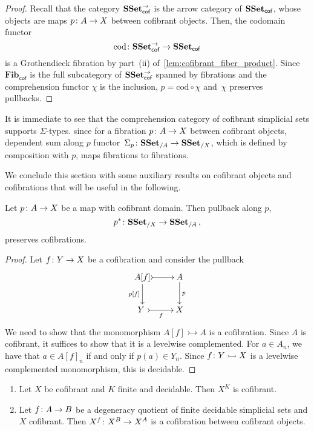 \documentclass[reqno,10pt,a4paper,oneside,draft]{amsart}
\begin{document}
\begin{proof} Recall that the category $\mathbf{SSet}^\to_{\mathsf{cof}}$ is the arrow category of $\mathbf{SSet}_{\mathsf{cof}}$, whose objects are
maps $p \colon A \to X$ between cofibrant objects. Then, the codomain
functor 
\[
\mathrm{cod} \colon \mathbf{SSet}^{\to}_{\mathsf{cof}} \to \mathbf{SSet}_{\mathsf{cof}}
\] 
is a Grothendieck fibration by part~(ii) of~\cref{lem:cofibrant_fiber_product}. 
Since $\mathbf{Fib}_{ \mathsf{cof}}$ is the full subcategory of $\mathbf{SSet}^{\to}_{\mathsf{cof}}$ spanned by fibrations and the comprehension functor $\chi$ is the inclusion, $p = \mathrm{cod} \circ \chi$
and~$\chi$ preserves pullbacks.
\end{proof}



\begin{remark} \label{thm:sigma-types} It is immediate to see that the comprehension category of cofibrant simplicial sets supports $\Sigma$-types. since for a fibration $p \colon A \to X$ between cofibrant objects, dependent sum along $p$  functor~$\Sigma_p \colon \mathbf{SSet}_{/A} \to \mathbf{SSet}_{/X}$, which is defined by
composition with $p$, maps fibrations to fibrations.
\end{remark}

\medskip


We conclude this section with some auxiliary results on cofibrant objects and cofibrations
that will be useful in the following. 


\begin{proposition} \label{thm:cof-pbk}  Let $p \colon A \to X$  be a map with cofibrant domain.
Then pullback along $p$, \[
p^* \colon \mathbf{SSet}_{/X} \to \mathbf{SSet}_{/A} \, , 
\]
preserves cofibrations. 
\end{proposition}

\begin{proof} Let $f \colon Y \to X$ be a cofibration and consider the pullback
\[
\xymatrix{
A[f]  \ar@{>->}[r] \ar[d]_-{p[f]} &  A \ar[d]^{p} \\
Y \ar@{>->}[r]_{f} \ & X}
\]
We need to show that the monomorphism $A[f] \rightarrowtail A$ is a cofibration. 
Since $A$ is cofibrant, it suffices to show that it is a levelwise complemented. For $a \in A_n$, we have that $a \in A[f]_n$ if and only if $p(a) \in Y_n$. Since $f \colon Y \rightarrowtail X$ is a levelwise complemented monomorphism, this is decidable.
\end{proof} 




\begin{proposition} \label{prop:X^kCofibrant}  \hfill 
\begin{enumerate}[$(i)$]
\item Let $X$ be cofibrant and $K$ finite and decidable. Then $X^K$ is cofibrant.
\item Let $f \colon A \rightarrow B$ be a degeneracy quotient of finite decidable simplicial sets and $X$  cofibrant. Then $X^f \colon X^B \rightarrow X^A$ is a cofibration between cofibrant objects.
\end{enumerate}
\end{proposition}
\end{document}
